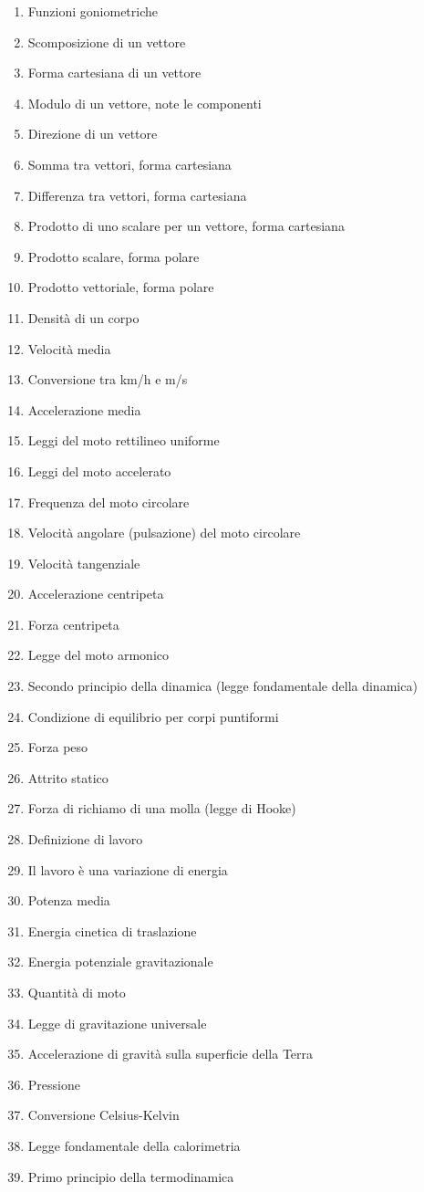 \documentclass[a4paper,11pt,italian]{article}
\begin{document}
\begin{enumerate}
\item Funzioni goniometriche
\item Scomposizione di un vettore
\item Forma cartesiana di un vettore
\item Modulo di un vettore, note le componenti
\item Direzione di un vettore 
\item Somma tra vettori, forma cartesiana
\item Differenza tra vettori, forma cartesiana
\item Prodotto di uno scalare per un vettore, forma cartesiana
\item Prodotto scalare, forma polare
\item Prodotto vettoriale, forma polare
\item Densità di un corpo
\item Velocità media
\item Conversione tra km/h e m/s
\item Accelerazione media
\item Leggi del moto rettilineo uniforme
\item Leggi del moto accelerato
\item Frequenza del moto circolare
\item Velocità angolare (pulsazione) del moto circolare
\item Velocità tangenziale
\item Accelerazione centripeta
\item Forza centripeta
\item Legge del moto armonico 
\item Secondo principio della dinamica (legge fondamentale della dinamica)
\item Condizione di equilibrio per corpi puntiformi
\item Forza peso
\item Attrito statico
\item Forza di richiamo di una molla (legge di Hooke)
\item Definizione di lavoro
\item Il lavoro è una variazione di energia
\item Potenza media
\item Energia cinetica di traslazione
\item Energia potenziale gravitazionale
\item Quantità di moto
\item Legge di gravitazione universale
\item Accelerazione di gravità sulla superficie della Terra 
\item Pressione 
\item Conversione Celsius-Kelvin
\item Legge fondamentale della calorimetria
\item Primo principio della termodinamica
\end{enumerate}
\end{document}
